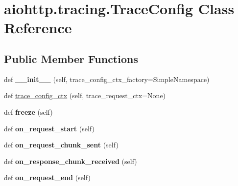 \hypertarget{classaiohttp_1_1tracing_1_1_trace_config}{}\section{aiohttp.\+tracing.\+Trace\+Config Class Reference}
\label{classaiohttp_1_1tracing_1_1_trace_config}
\subsection*{Public Member Functions}
\begin{DoxyCompactItemize}
\item 
\mbox{\label{classaiohttp_1_1tracing_1_1_trace_config_ab216aa412641b72b662d185d75454769}} 
def {\bfseries \+\_\+\+\_\+init\+\_\+\+\_\+} (self, trace\+\_\+config\+\_\+ctx\+\_\+factory=Simple\+Namespace)
\item 
def \hyperlink{classaiohttp_1_1tracing_1_1_trace_config_a6dd81a14ce87b3d96b7997c64e666fa6}{trace\+\_\+config\+\_\+ctx} (self, trace\+\_\+request\+\_\+ctx=None)
\item 
\mbox{\label{classaiohttp_1_1tracing_1_1_trace_config_ac4ab5a010dc37bf7d975fa07298a5301}} 
def {\bfseries freeze} (self)
\item 
\mbox{\label{classaiohttp_1_1tracing_1_1_trace_config_a7c9051383b45b38dd96cbf3717a8bdb5}} 
def {\bfseries on\+\_\+request\+\_\+start} (self)
\item 
\mbox{\label{classaiohttp_1_1tracing_1_1_trace_config_a959615b7ba4e66e799dda614812702e9}} 
def {\bfseries on\+\_\+request\+\_\+chunk\+\_\+sent} (self)
\item 
\mbox{\label{classaiohttp_1_1tracing_1_1_trace_config_acb88a6311f2a84cf045626721b54721f}} 
def {\bfseries on\+\_\+response\+\_\+chunk\+\_\+received} (self)
\item 
\mbox{\label{classaiohttp_1_1tracing_1_1_trace_config_a93edd4a3bc2016bde751b26066e9bbef}} 
def {\bfseries on\+\_\+request\+\_\+end} (self)
\item 

\end{DoxyCompactItemize}
